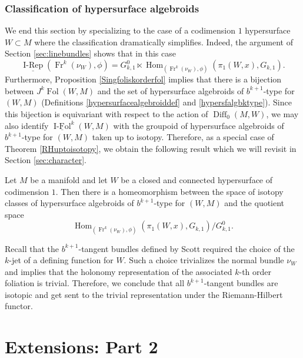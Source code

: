 \documentclass[10pt]{amsart}
\newcommand{\Hom}{\operatorname{Hom}}
\newcommand{\Diff}{{\operatorname{Diff}}}
\newcommand{\FolObj}{{\operatorname{Fol}}}
\newcommand{\IsotopyCat}{{\underline{\operatorname{I-Rep}}}}
\newcommand{\IsoCat}{\underline{\operatorname{I-Fol}}}
\newcommand{\Fr}{{\operatorname{Fr}}}
\numberwithin{theoremalpha}{section}
\numberwithin{equation}{section}
\numberwithin{definition}{section}
\numberwithin{theorem}{section}
\numberwithin{proposition}{section}
\numberwithin{lemma}{section}
\numberwithin{example}{section}
\numberwithin{remark}{section}
\numberwithin{corollary}{section}
\numberwithin{question}{section}
\numberwithin{problem}{section}
\numberwithin{assumption}{section}
\theoremstyle{named}
\numberwithin{equation}{section}
\begin{document}
\subsubsection{Classification of hypersurface algebroids}
We end this section by specializing to the case of a codimension $1$ hypersurface $W \subset M$ where the classification dramatically simplifies. Indeed, the argument of Section \ref{sec:linebundles} shows that in this case
\[
\IsotopyCat(\Fr^k(\nu_{W}),\phi) = G_{k,1}^0 \ltimes \Hom_{(\Fr^k(\nu_{W}),\phi)}(\pi_{1}(W, x), G_{k,1}). 
\]
Furthermore, Proposition \ref{Singfoliskorderfol} implies that there is a bijection between $J^k\FolObj(W,M)$ and the set of hypersurface algebroids of $b^{k+1}$-type for $(W,M)$ (Definitions \ref{hypersurfacealgebroiddef} and \ref{hypersfalgbktype}). Since this bijection is equivariant with respect to the action of $\Diff_0(M, W)$, we may also identify $\IsoCat^{k}(W,M)$ with the groupoid of hypersurface algebroids of $b^{k+1}$-type for $(W,M)$ taken up to isotopy. Therefore, as a special case of Theorem \ref{RHuptoisotopy}, we obtain the following result which we will revisit in Section \ref{sec:character}. 
\begin{corollary}\label{cor:hypersurfclass}
Let $M$ be a manifold and let $W$ be a closed and connected hypersurface of codimension $1$. Then there is a homeomorphism between the space of isotopy classes of hypersurface algebroids of $b^{k+1}$-type for $(W,M)$ and the quotient space
\[
 \Hom_{(\Fr^k(\nu_{W}),\phi)}(\pi_{1}(W, x), G_{k,1})/G_{k,1}^0. 
\]
\end{corollary}
\begin{remark} \label{rem:bktangentbundleScott}
Recall that the $b^{k+1}$-tangent bundles defined by Scott \cite{MR3523250} required the choice of the $k$-jet of a defining function for $W$. Such a choice trivializes the normal bundle $\nu_{W}$ and implies that the holonomy representation of the associated $k$-th order foliation is trivial. Therefore, we conclude that all $b^{k+1}$-tangent bundles are isotopic and get sent to the trivial representation under the Riemann-Hilbert functor. 
\end{remark}



\section{Extensions: Part 2}\label{sec:extending2}
\end{document}
